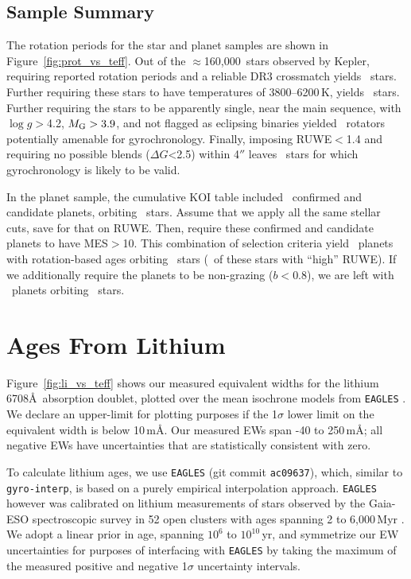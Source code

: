 \documentclass[11pt,twocolumn,tighten]{aastex63}
\newcommand{\nkeplerstars}{$\approx$160{,}000}
\begin{document}
\subsection{Sample Summary}
\label{subsec:tally}

The rotation periods for the star and planet samples are shown in
Figure~\ref{fig:prot_vs_teff}.  Out of the \nkeplerstars\ stars
observed by Kepler, requiring reported rotation periods and a reliable
DR3 crossmatch yields \nuniqstarsantosrot\ stars.  Further requiring
these stars to have temperatures of 3800--6200\,K, yields
\nuniqstarsantosrotteffcut\ stars.  Further requiring the stars to be
apparently single, near the main sequence, with $\log g$$>$4.2,
$M_{\rm G}>3.9$, and not flagged as eclipsing binaries yielded
\nuniqstarsantosallbutruwe\ rotators potentially amenable for
gyrochronology.  Finally, imposing RUWE$<$1.4 and requiring no
possible blends ($\Delta G$<2.5) within 4$''$ leaves
\nuniqstarsantosrotgyroappl\ stars for which gyrochronology is likely
to be valid.


In the planet sample, the cumulative KOI table included
\nnonfpcumkois\ confirmed and candidate planets, orbiting
\nnonfpcumkoihosts\ stars.  Assume that we apply all the same stellar
cuts, save for that on RUWE.  Then, require these confirmed and
candidate planets to have MES$>$10.  This combination of selection
criteria yield \nplwgyroagewithgrazingandhighruwe\ planets with
rotation-based ages orbiting
\nplhoststarwgyroagewithgrazingandhighruwe\ stars
(\nplhoststarwgyroagejusthighruwe\ of these stars with ``high'' RUWE).
If we additionally require the planets to be non-grazing ($b<0.8$), we
are left with \nplwgyroagenograzing\ planets orbiting
\nplhoststarwgyroagenograzing\ stars.




\section{Ages From Lithium}
\label{sec:liage}


Figure~\ref{fig:li_vs_teff} shows our measured equivalent widths for
the lithium 6708\AA\ absorption doublet, plotted over the mean
isochrone models from \texttt{EAGLES} \citep{Jeffries_2023}.  We
declare an upper-limit for plotting purposes if the 1$\sigma$ lower
limit on the equivalent width is below 10\,m\AA.  Our measured EWs
span -40 to 250\,m\AA; all negative EWs have uncertainties that are
statistically consistent with zero.

To calculate lithium ages, we use \texttt{EAGLES} (git commit
\texttt{ac09637}), which, similar to \texttt{gyro-interp}, is based on
a purely empirical interpolation approach.  \texttt{EAGLES} however
was calibrated on lithium measurements of stars observed by the
Gaia-ESO spectroscopic survey in 52 open clusters with ages spanning 2
to 6{,}000\,Myr \citep{Jeffries_2023}.  We adopt a linear prior in
age, spanning $10^6$ to $10^{10}$\,yr, and symmetrize our EW
uncertainties for purposes of interfacing with \texttt{EAGLES} by
taking the maximum of the measured positive and negative 1$\sigma$
uncertainty intervals.
\end{document}
